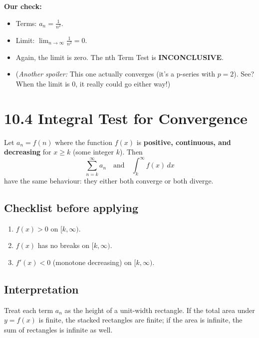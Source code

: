 \documentclass{article}
\begin{document}
\begin{enumerate}[label=\textbf{\arabic*.},itemsep=15pt]
        \textbf{Our check:}
        \begin{itemize}
            \item Terms: \(a_n = \frac{1}{n^2}\).
            \item Limit: \(\lim_{n\to\infty} \frac{1}{n^2} = 0\).
            \item Again, the limit is zero. The nth Term Test is \textbf{INCONCLUSIVE}.
            \item (\textit{Another spoiler:} This one actually converges (it's a p-series with \(p=2\)). See? When the limit is 0, it really could go either way!)
        \end{itemize}
\end{enumerate}

\newpage
\section{10.4 Integral Test for Convergence}

\begin{tcolorbox}[colback=gray!8,colframe=black,title=Statement of the Test]
Let \(a_n = f(n)\) where the function \(f(x)\) is  
\textbf{positive, continuous, and decreasing} for \(x \ge k\) (some integer \(k\)).  
Then
\[
\sum_{n=k}^{\infty} a_n
\quad\text{and}\quad
\int_{k}^{\infty} f(x)\,dx
\]
have the same behaviour: they either both converge or both diverge.
\end{tcolorbox}

\subsection*{Checklist before applying}
\begin{enumerate}[label=\arabic*. ,itemsep=2pt]
  \item \(f(x) > 0\) on \([k,\infty)\).
  \item \(f(x)\) has no breaks on \([k,\infty)\).
  \item \(f'(x) < 0\) (monotone decreasing) on \([k,\infty)\).
\end{enumerate}

\subsection*{Interpretation}
Treat each term \(a_n\) as the height of a unit-width rectangle.  
If the total area under \(y=f(x)\) is finite, the stacked rectangles are finite;  
if the area is infinite, the sum of rectangles is infinite as well.
\end{document}

